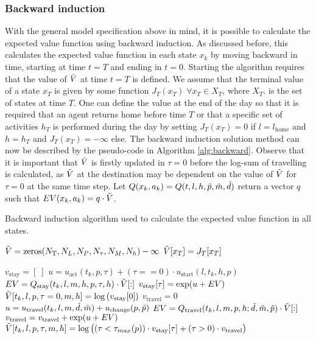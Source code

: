 \subsubsection{Backward induction}
With the general model specification above in mind, it is possible to calculate the expected value function using backward induction. As discussed before, this calculates the expected value function in each state $x_k$ by moving backward in time, starting at time $t=T$ and ending in $t=0$. Starting the algorithm requires that the value of $\tilde{V}$ at time $t=T$ is defined. We assume that the terminal value of a state $x_T$ is given by some function $J_T(x_T) \;\forall x_T \in X_T$, where $X_T$. is the set of states at time $T$. One can define the value at the end of the day so that it is required that an agent returns home before time $T$ or that a specific set of activities $h_T$ is performed during the day by setting $J_T(x_T)=0$ if $l= l_\text{home}$ and $h= h_T$ and $J_T(x_T)=-\infty$ else. The backward induction solution method can now be described by the pseudo-code in Algorithm \ref{alg:backward}. Observe that it is important that $\tilde{V}$ is firstly updated in $\tau=0$ before the log-sum of travelling is calculated, as $\tilde{V}$ at the destination may be dependent on the value of $\tilde{V}$ for $\tau=0$ at the same time step. Let $Q(x_k,a_k)=Q(t,l,h,\tilde{p},\tilde{m},\tilde{d})$ return a vector $q$ such that $EV(x_k,a_k) =  q \cdot \tilde{V}$. 
\begin{algorithm}
\caption{\label{alg:backward} Backward induction algorithm used to calculate the expected value function in all states.}
\begin{algorithmic}[1]
\State $\tilde{V} = \text{zeros}(N_\text{T},N_L,N_P,N_\tau,N_M,N_h) -\infty $
\State $\tilde{V}[x_T] = J_T[x_T]$
\EndFor

\State
{} 
\State
\State $v_\text{stay} = [\;]$ 
\State $u = u_\text{act}(t_k,p,\tau) + (\tau==0) \cdot  u_\text{start}(l,t_k,h,p)$
\State $EV = Q_{\text{stay}}{(t_k,l,m,h,p,\tau,h)} \cdot \tilde{V}[:]$
\State $v_\text{stay}[\tau] = \exp(u + EV)$
\EndFor
\State $\tilde{V}[t_k,l,p,\tau=0,m,h] = \log\left(v_\text{stay}[0]\right)$
\State 
\State $v_\text{travel} = 0$ 
\State $u= u_\text{travel}(t_k,l,m,\tilde{d},\tilde{m}) + u_\text{change}(p,\tilde{p})$
\State $EV = Q_{\text{travel}}(t_k,l,m,p,h;\tilde{d},\tilde{m},\tilde{p}) \cdot \tilde{V}[:]$
\State $v_\text{travel} =v_\text{travel}+ \exp(u+EV)$
\EndFor
\State
{}
\State $\tilde{V}[t_k,l,p,\tau,m,h]=\log\big((\tau < \tau_{max}(p))\cdot v_\text{stay}[\tau] + (\tau>0) \cdot v_\text{travel}\big)$
\EndFor
\State
\EndFor
\EndFor
\end{algorithmic}
\end{algorithm}

